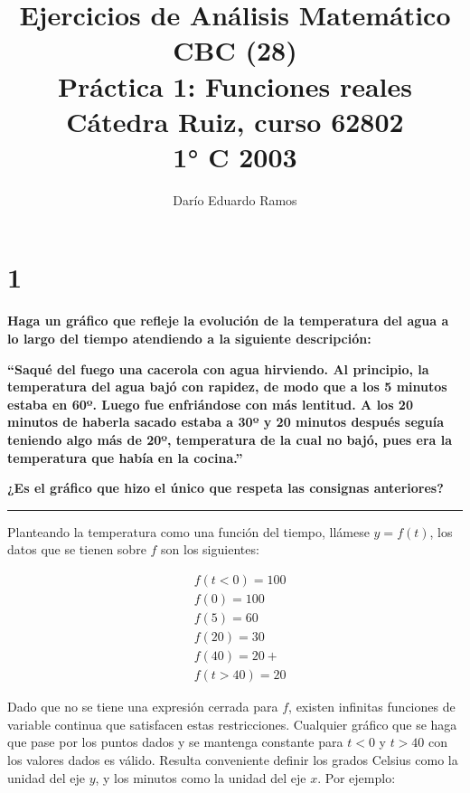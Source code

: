 \documentclass{article}
\title{Ejercicios de Análisis Matemático CBC (28) \\
Práctica 1: Funciones reales \\
Cátedra Ruiz, curso 62802 \\
1° C 2003}
\author{Darío Eduardo Ramos}
\begin{document}
\maketitle

\tableofcontents{}

\newpage

\section*{1}
\label{sec:1}

\textbf{Haga un gráfico que refleje la evolución de la temperatura del agua a lo largo del tiempo atendiendo a la siguiente descripción:}

\vspace{1em}

\textbf{``Saqué del fuego una cacerola con agua hirviendo. Al principio, la temperatura del agua bajó con rapidez, de modo que a los 5 minutos estaba en 60º. Luego fue enfriándose con más lentitud. A los 20 minutos de haberla sacado estaba a 30º y 20 minutos después seguía teniendo algo más de 20º, temperatura de la cual no bajó, pues era la temperatura que había en la cocina.'' }

\vspace{1em}

\textbf{¿Es el gráfico que hizo el único que respeta las consignas anteriores?}

\vspace{1em}

\hrule

\vspace{1em}

Planteando la temperatura como una función del tiempo, llámese $y = f(t)$, los datos que se tienen sobre $f$ son los siguientes:

\begin{subequations}
\begin{align}
& f(t < 0) = 100 \\
& f(0) = 100 \\
& f(5) = 60 \\
& f(20) = 30 \\
& f(40) = 20+ \\
& f(t > 40) = 20
\end{align}
\end{subequations}

Dado que no se tiene una expresión cerrada para $f$, existen infinitas funciones de variable continua que satisfacen estas restricciones. Cualquier gráfico que se haga que pase por los puntos dados y se mantenga constante para $t < 0$ y $t > 40$ con los valores dados es válido. Resulta conveniente definir los grados Celsius como la unidad del eje $y$, y los minutos como la unidad del eje $x$. Por ejemplo:
\end{document}
